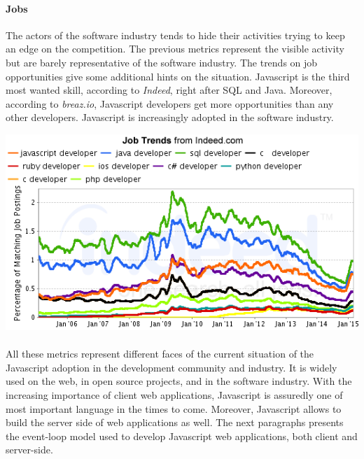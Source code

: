 
\paragraph{Jobs}

The actors of the software industry tends to hide their activities trying to keep an edge on the competition.
The previous metrics represent the visible activity but are barely representative of the software industry.
The trends on job opportunities give some additional hints on the situation.
Javascript is the third most wanted skill, according to \textit{Indeed}, right after SQL and Java.
Moreover, according to \textit{breaz.io}, Javascript developers get more opportunities than any other developers.
Javascript is increasingly adopted in the software industry.

\includegraphics[width=0.9\linewidth]{../../data/js-trends/jobgraph}

\paragraph{}

All these metrics represent different faces of the current situation of the Javascript adoption in the development community and industry.
It is widely used on the web, in open source projects, and in the software industry.
With the increasing importance of client web applications, Javascript is assuredly one of most important language in the times to come.
Moreover, Javascript allows to build the server side of web applications as well.
The next paragraphs presents the event-loop model used to develop Javascript web applications, both client and server-side.

